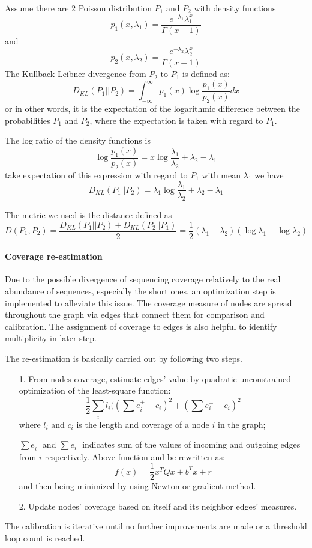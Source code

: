 Assume there are 2 Poisson distribution $P_1$ and $P_2$ with density functions $$p_1(x,\lambda_1)=\frac{e^{-\lambda_1}\lambda_1^x}{\Gamma(x+1)}$$ and $$p_2(x,\lambda_2)=\frac{e^{-\lambda_2}\lambda_2^x}{\Gamma(x+1)}$$ 
The Kullback-Leibner divergence from $P_2$ to $P_1$ is defined as:
$$D_{KL}(P_1||P_2)=\int_{-\infty}^{\infty} p_1(x)\log{\frac{p_1(x)}{p_2(x)}} dx$$
or in other words,  it is the expectation of the logarithmic difference between the probabilities $P_1$ and $P_2$, where the expectation is taken with regard to $P_1$.

The log ratio of the density functions is
$$\log{\frac{p_1(x)}{p_2(x)}}=x\log{\frac{\lambda_1}{\lambda_2}}+\lambda_2-\lambda_1$$
take expectation of this expression with regard to $P_1$ with mean $\lambda_1$ we have
$$D_{KL}(P_1||P_2)=\lambda_1\log{\frac{\lambda_1}{\lambda_2}}+\lambda_2-\lambda_1$$

The metric we used is the distance defined as
$$D(P_1,P_2)=\frac{D_{KL}(P_1||P_2)+D_{KL}(P_2||P_1)}{2}=\frac{1}{2}(\lambda_1-\lambda_2)(\log{\lambda_1}-\log{\lambda_2})$$

\paragraph{Coverage re-estimation}
Due to the possible divergence of sequencing coverage relatively to the real abundance of sequences, especially the short ones, an optimization step is implemented to alleviate this issue. The coverage measure of nodes are spread throughout the graph via edges that connect them for comparison and calibration. 
The assignment of coverage to edges is also helpful to identify multiplicity in later step. 

The re-estimation is basically carried out by following two steps.
\begin{itemize}
\item[1.] From nodes coverage, estimate edges' value by quadratic unconstrained optimization of the least-square function:
$$\frac{1}{2}\sum_{i}{l_i((\sum{e^{+}_{i}}-c_i)^2+(\sum{e^{-}_{i}}-c_i)^2}$$
where $l_i$ and $c_i$ is the length and coverage of a node $i$ in the graph;

$\sum{e^{+}_{i}}$ and $\sum{e^{-}_{i}}$ indicates sum of the values of incoming and outgoing edges from $i$ respectively. 
Above function and be rewritten as:
$$f(x)=\frac{1}{2}x^TQx + b^Tx + r$$
and then being minimized by using Newton or gradient method.
\item[2.] Update nodes' coverage based on itself and its neighbor edges' measures.
\end{itemize}
The calibration is iterative until no further improvements are made or a threshold loop count is reached.
